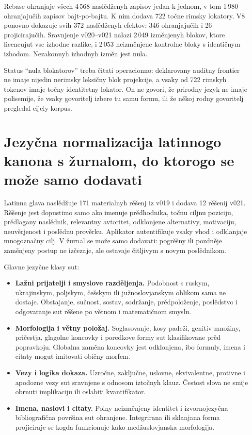\documentclass[11pt]{article}
\begin{document}
Rebase ohranjaje všech 4\,568 naslědženyh zapisov jedan-k-jednom, v tom 1\,980 ohranjajučih zapisov bajt-po-bajtu. K nim dodava 722 točne rimsky lokatory. V8 ponovno dokazuje svih 372 naslědženyh efektov: 346 ohranjajučih i 26 projicirajučih. Sravnjenje v020--v021 nalazi 2\,049 izměnjenyh blokov, ktore licencujut vse izhodne razlike, i 2\,053 neizměnjene kontrolne bloky s identičnym izhodom. Nezakonnyh izhodnyh izměn jest nula.

Status ``nula blokatorov'' treba čitati operacionno: deklarovany auditny frontier ne imaje nijedin nerimsky leksičny blok projekcije, a vsaky od 722 rimskyh tokenov imaje točny identitetny lokator. On ne govori, že prirodny jezyk ne imaje polisemije, že vsaky govoritelj izbere tu samu formu, ili že někoj rodny govoritelj pregledal cijely korpus.

\section{Jezyčna normalizacija latinnogo kanona s žurnalom, do ktorogo se može samo dodavati}

Latinna glava naslědžuje 171 materialnyh rěšenj iz v019 i dodava 12 rěšenij v021. Rěšenje jest dopustimo samo ako imenuje prědhodnika, točnu ciljnu poziciju, prědlagany naslědnik, relevantny avtoritet, odklonjene alternativy, motivaciju, neuvěrjenost i poslědnu prověrku. Aplikator autentifikuje vsaky vhod i odklanjaje mnogoznačny cilj. V žurnal se može samo dodavati: pogrěšny ili pozdněje zaměnjeny postup ne izčezaje, ale ostavaje čitljivym s novym poslědnikom.

Glavne jezyčne klasy sut:

\begin{itemize}
\item \textbf{Lažni prijatelji i smyslove razděljenja.} Podobnost s ruskym, ukrajinskym, poljskym, češskym ili južnoslovjanskym oblikom sama ne dostaje. Obstajanje, sučnost, sostav, sodržanje, prědpoloženje, poslědstvo i odgovaranje sut rěšene po větnom i matematičnom smyslu.
\item \textbf{Morfologija i větny položaj.} Soglasovanje, kosy padeži, genitiv množiny, pričestja, glagolne koncovky i poredkove formy sut klasifikovane prěd popravkoju. Globalna zaměna koncovky jest odklonjena, ibo formuly, imena i citaty mogut imitovati običny morfem.
\item \textbf{Vezy i logika dokaza.} Uzročne, zaključne, uslovne, ekvivalentne, protivne i apodozne vezy sut sravnjene s odnosom iztočnyh klauz. Čestost slova ne smije obrnuti implikaciju ili oslabiti kvantifikator.
\item \textbf{Imena, naslovi i citaty.} Polny neizměnjeny identitet i izvornojezyčna bibliografična površina sut ohranjene. Integrirana ili sklanjana forma projiciraje se kogda funkcionuje kako medžuslovjanska morfologija.
\end{itemize}
\end{document}
